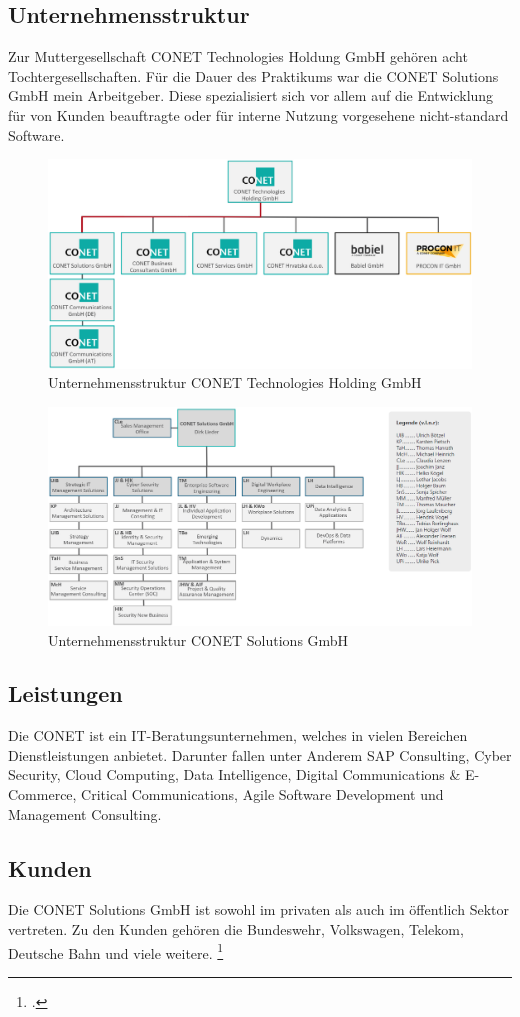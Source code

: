 \subsection{Unternehmensstruktur}
Zur Muttergesellschaft CONET Technologies Holdung GmbH gehören acht Tochtergesellschaften. Für die Dauer des Praktikums war die CONET Solutions GmbH mein Arbeitgeber. Diese spezialisiert sich vor allem auf die Entwicklung für von Kunden beauftragte oder für interne Nutzung vorgesehene nicht-standard Software.
\begin{figure}[H]
  \centering
    \includegraphics[width = 15cm]{bilder/organigramm_conet}
    \caption{Unternehmensstruktur CONET Technologies Holding GmbH}
\end{figure}

\begin{figure}[H]
  \centering
    \includegraphics[width = 15cm]{bilder/organigramm_conet_solutions}
    \caption{Unternehmensstruktur CONET Solutions GmbH}
\end{figure}

\subsection{Leistungen}

Die CONET ist ein IT-Beratungsunternehmen, welches in vielen Bereichen Dienstleistungen anbietet. Darunter fallen unter Anderem SAP Consulting, Cyber Security, Cloud Computing, Data Intelligence, Digital Communications \& E-Commerce, Critical Communications, Agile Software Development und Management Consulting. 

\subsection{Kunden}
Die CONET Solutions GmbH ist sowohl im privaten als auch im öffentlich Sektor vertreten. Zu den Kunden gehören die Bundeswehr, Volkswagen, Telekom, Deutsche Bahn und viele weitere. \footcite [Auszug aus der Kundenliste]{Kunden} 